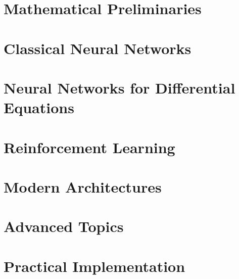 \documentclass{kaobook}
\begin{document}
\frontmatter

\cleardoublepage 
\color{black}            %
\tableofcontents
\cleardoublepage      
\mainmatter
\part{Mathematical Preliminaries}







\part{Classical Neural Networks}







\part{Neural Networks for Differential Equations}






\part{Reinforcement Learning}



\part{Modern Architectures}



\part{Advanced Topics}






\part{Practical Implementation}




\appendix







\backmatter
\end{document}

